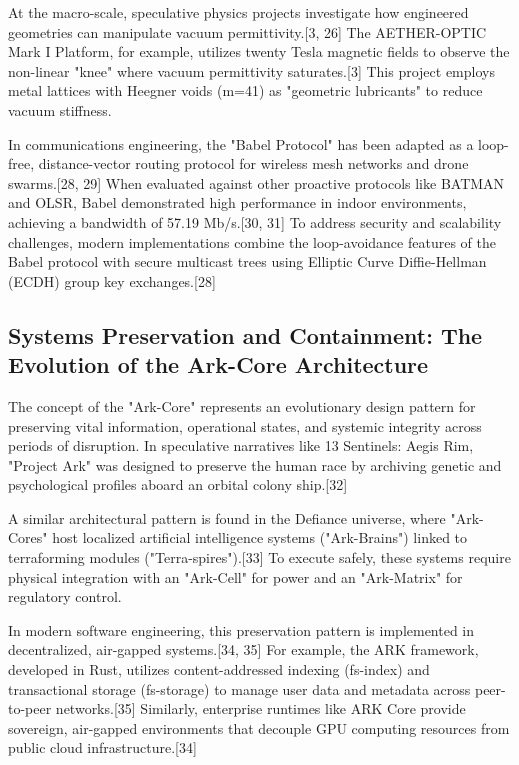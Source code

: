 \documentclass[aps,prd,11pt,onecolumn,superscriptaddress,nofootinbib,floatfix]{revtex4-2}
\begin{document}
At the macro-scale, speculative physics projects investigate how engineered geometries can manipulate vacuum permittivity.[3, 26] The AETHER-OPTIC Mark I Platform, for example, utilizes twenty Tesla magnetic fields to observe the non-linear "knee" where vacuum permittivity saturates.[3] This project employs metal lattices with Heegner voids (m=41) as "geometric lubricants" to reduce vacuum stiffness.


In communications engineering, the "Babel Protocol" has been adapted as a loop-free, distance-vector routing protocol for wireless mesh networks and drone swarms.[28, 29] When evaluated against other proactive protocols like BATMAN and OLSR, Babel demonstrated high performance in indoor environments, achieving a bandwidth of 57.19 Mb/s.[30, 31] To address security and scalability challenges, modern implementations combine the loop-avoidance features of the Babel protocol with secure multicast trees using Elliptic Curve Diffie-Hellman (ECDH) group key exchanges.[28]


\subsection{Systems Preservation and Containment: The Evolution of the Ark-Core Architecture}
The concept of the "Ark-Core" represents an evolutionary design pattern for preserving vital information, operational states, and systemic integrity across periods of disruption. In speculative narratives like 13 Sentinels: Aegis Rim, "Project Ark" was designed to preserve the human race by archiving genetic and psychological profiles aboard an orbital colony ship.[32]


A similar architectural pattern is found in the Defiance universe, where "Ark-Cores" host localized artificial intelligence systems ("Ark-Brains") linked to terraforming modules ("Terra-spires").[33] To execute safely, these systems require physical integration with an "Ark-Cell" for power and an "Ark-Matrix" for regulatory control.


In modern software engineering, this preservation pattern is implemented in decentralized, air-gapped systems.[34, 35] For example, the ARK framework, developed in Rust, utilizes content-addressed indexing (fs-index) and transactional storage (fs-storage) to manage user data and metadata across peer-to-peer networks.[35] Similarly, enterprise runtimes like ARK Core provide sovereign, air-gapped environments that decouple GPU computing resources from public cloud infrastructure.[34]
\end{document}
